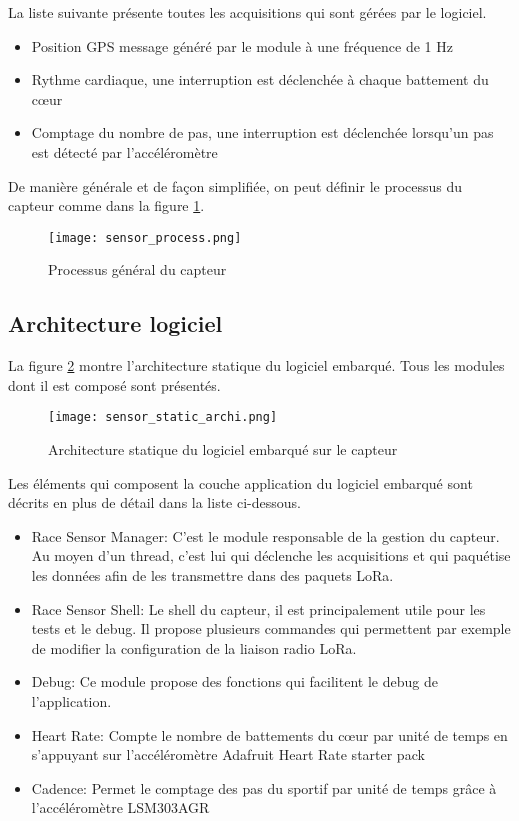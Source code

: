 La liste suivante présente toutes les acquisitions qui sont gérées par le logiciel.

\begin{itemize}
\item Position GPS message généré par le module à une fréquence de 1 Hz
\item Rythme cardiaque, une interruption est déclenchée à chaque battement du cœur
\item Comptage du nombre de pas, une interruption est déclenchée lorsqu'un pas est détecté par l'accéléromètre
\end{itemize}

De manière générale et de façon simplifiée, on peut définir le processus du capteur comme dans la figure \ref{fig:sensor_process}.

\begin{figure}[htb]
\centering 
\texttt{[image: sensor\_process.png]} 
\caption{Processus général du capteur}
\label{fig:sensor_process}
\end{figure}

\subsection{Architecture logiciel}

La figure \ref{fig:sensor_static_archi} montre l'architecture statique du logiciel embarqué. Tous les modules dont il est composé sont présentés.

\begin{figure}[htb]
\centering 
\texttt{[image: sensor\_static\_archi.png]} 
\caption{Architecture statique du logiciel embarqué sur le capteur}
\label{fig:sensor_static_archi}
\end{figure}

Les éléments qui composent la couche application du logiciel embarqué sont décrits en plus de détail dans la liste ci-dessous.

\begin{itemize}
\item Race Sensor Manager: C'est le module responsable de la gestion du capteur. Au moyen d'un thread, c'est lui qui déclenche les acquisitions et qui paquétise les données afin de les transmettre dans des paquets LoRa.
\item Race Sensor Shell: Le shell du capteur, il est principalement utile pour les tests et le debug. Il propose plusieurs commandes qui permettent par exemple de modifier la configuration de la liaison radio LoRa.
\item Debug: Ce module propose des fonctions qui facilitent le debug de l'application.
\item Heart Rate: Compte le nombre de battements du cœur par unité de temps en s'appuyant sur l'accéléromètre Adafruit Heart Rate starter pack
\item Cadence: Permet le comptage des pas du sportif par unité de temps grâce à l'accéléromètre LSM303AGR
\end{itemize}

